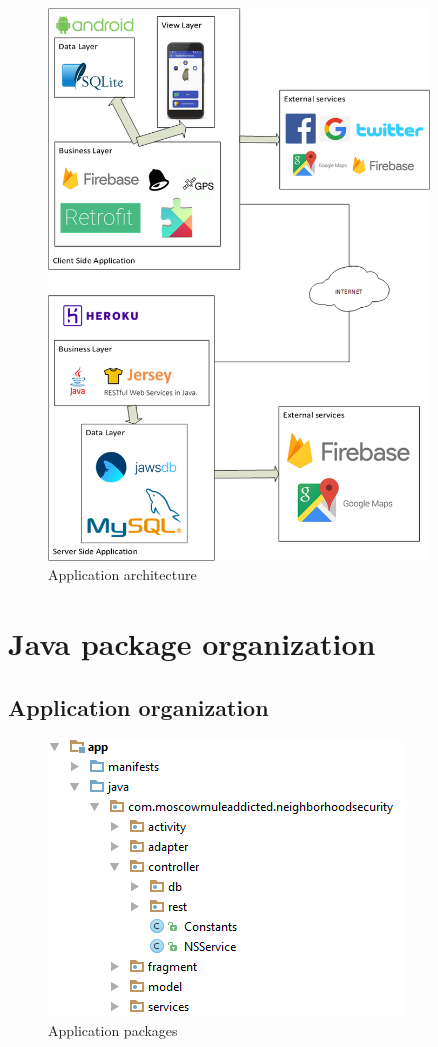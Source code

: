 \documentclass[a4paper]{scrreprt}
\begin{document}
\begin{figure}[H]
	\centering
	\includegraphics[width=0.9\textwidth]{imgs/structure}
	\caption{Application architecture}
\end{figure}

\section{Java package organization}
\subsection{Application organization}
\begin{figure}[H]
	\centering
	\includegraphics{imgs/packages}
	\caption{Application packages}
\end{figure}
\end{document}
